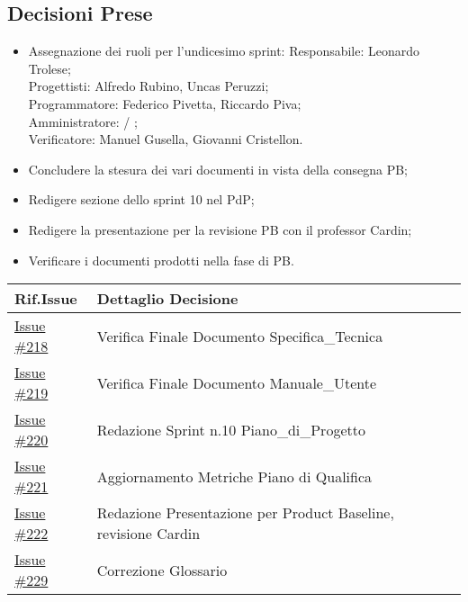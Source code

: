 \documentclass[10pt]{article}
\begin{document}
\subsection{Decisioni Prese}
    \begin{itemize}
        \item   Assegnazione dei ruoli per l'undicesimo sprint:
                Responsabile: Leonardo Trolese;\\
                Progettisti: Alfredo Rubino, Uncas Peruzzi;\\
                Programmatore: Federico Pivetta, Riccardo Piva;\\
                Amministratore: / ;\\
                Verificatore: Manuel Gusella, Giovanni Cristellon.
        \item Concludere la stesura dei vari documenti in vista della consegna PB;
        \item Redigere sezione dello sprint 10 nel PdP;
        \item Redigere la presentazione per la revisione PB con il professor Cardin;
        \item Verificare i documenti prodotti nella fase di PB.
    \end{itemize}
    \begin{center}
    \begin{tabular}{|>{\centering\arraybackslash}m{3cm}|>{\centering\arraybackslash}m{12cm}|}
	\hline
	\textbf{Rif.Issue} & \textbf{Dettaglio Decisione}\\
	\hline
            \href{https://github.com/SevenBitsSwe/7BitsDocs/issues/218}{Issue \#218} & Verifica Finale Documento Specifica_Tecnica\\
            \href{https://github.com/SevenBitsSwe/7BitsDocs/issues/219}{Issue \#219} & Verifica Finale Documento Manuale_Utente\\
            \href{https://github.com/SevenBitsSwe/7BitsDocs/issues/220}{Issue \#220} & Redazione Sprint n.10 Piano_di_Progetto\\
            \href{https://github.com/SevenBitsSwe/7BitsDocs/issues/221}{Issue \#221} & Aggiornamento Metriche Piano di Qualifica\\
            \href{https://github.com/SevenBitsSwe/7BitsDocs/issues/222}{Issue \#222} & Redazione Presentazione per Product Baseline, revisione Cardin\\
            \href{https://github.com/SevenBitsSwe/7BitsDocs/issues/229}{Issue \#229} & Correzione Glossario\\
        \hline
    \end{tabular}
    \end{center}
\end{document}
